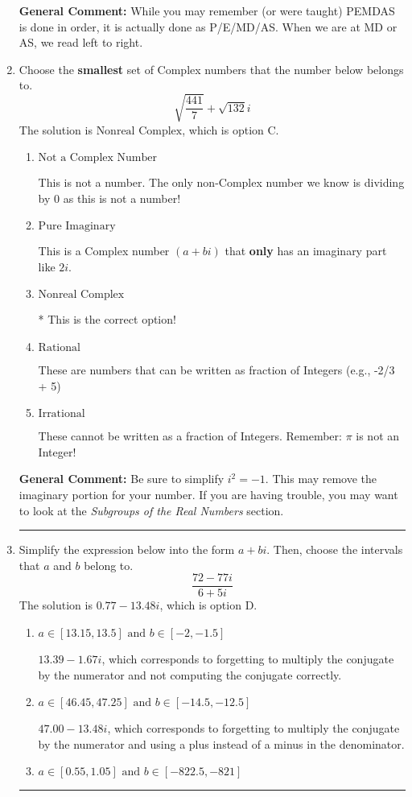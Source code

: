 \documentclass{extbook}[14pt]
\newcommand{\litem}[1]{\item #1

\rule{\textwidth}{0.4pt}}
\begin{document}
\begin{enumerate}
{\textbf{General Comment:} While you may remember (or were taught) PEMDAS is done in order, it is actually done as P/E/MD/AS. When we are at MD or AS, we read left to right.
}
\litem{
Choose the \textbf{smallest} set of Complex numbers that the number below belongs to.
\[ \sqrt{\frac{441}{7}}+\sqrt{132} i \]The solution is \( \text{Nonreal Complex} \), which is option C.\begin{enumerate}[label=\Alph*.]
\item \( \text{Not a Complex Number} \)

This is not a number. The only non-Complex number we know is dividing by 0 as this is not a number!
\item \( \text{Pure Imaginary} \)

This is a Complex number $(a+bi)$ that \textbf{only} has an imaginary part like $2i$.
\item \( \text{Nonreal Complex} \)

* This is the correct option!
\item \( \text{Rational} \)

These are numbers that can be written as fraction of Integers (e.g., -2/3 + 5)
\item \( \text{Irrational} \)

These cannot be written as a fraction of Integers. Remember: $\pi$ is not an Integer!
\end{enumerate}

\textbf{General Comment:} Be sure to simplify $i^2 = -1$. This may remove the imaginary portion for your number. If you are having trouble, you may want to look at the \textit{Subgroups of the Real Numbers} section.
}
\litem{
Simplify the expression below into the form $a+bi$. Then, choose the intervals that $a$ and $b$ belong to.
\[ \frac{72 - 77 i}{6 + 5 i} \]The solution is \( 0.77  - 13.48 i \), which is option D.\begin{enumerate}[label=\Alph*.]
\item \( a \in [13.15, 13.5] \text{ and } b \in [-2, -1.5] \)

 $13.39  - 1.67 i$, which corresponds to forgetting to multiply the conjugate by the numerator and not computing the conjugate correctly.
\item \( a \in [46.45, 47.25] \text{ and } b \in [-14.5, -12.5] \)

 $47.00  - 13.48 i$, which corresponds to forgetting to multiply the conjugate by the numerator and using a plus instead of a minus in the denominator.
\item \( a \in [0.55, 1.05] \text{ and } b \in [-822.5, -821] \)


\end{enumerate}}
\end{enumerate}
\end{document}
